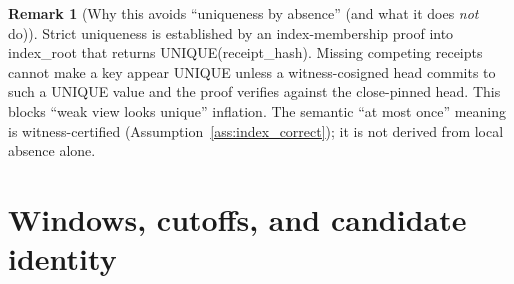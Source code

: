 \documentclass[11pt]{article}
\newcommand{\1}{\mathbf{1}}
\theoremstyle{definition}
\newtheorem{remark}{Remark}
\theoremstyle{plain}
\begin{document}
\begin{remark}[Why this avoids ``uniqueness by absence'' (and what it does \emph{not} do)]
Strict uniqueness is established by an index-membership proof into \textsf{index\_root} that returns \textsf{UNIQUE}(\textsf{receipt\_hash}). Missing competing receipts cannot make a key appear UNIQUE unless a witness-cosigned head commits to such a UNIQUE value and the proof verifies against the close-pinned head. This blocks ``weak view looks unique'' inflation. The semantic ``at most once'' meaning is witness-certified (Assumption~\ref{ass:index_correct}); it is not derived from local absence alone.
\end{remark}

\section{Windows, cutoffs, and candidate identity}
\label{sec:windows}
\end{document}

